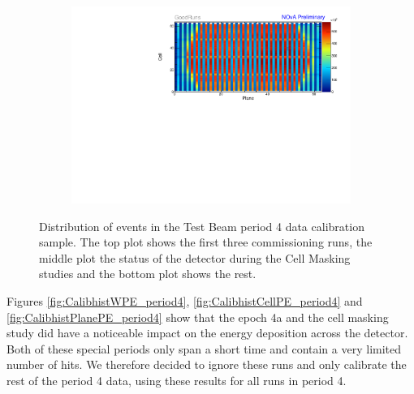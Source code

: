 \begin{figure}[!hbtp]
\begin{subfigure}[b]{\textwidth}
\includegraphics[width=\textwidth]{Plots/TBCalibration/Attenprofs_P4Data_CellPlane_GoodRuns.pdf}
\end{subfigure}
\caption[Plane-Cell distribution of hits for the period 4 data sample]{Distribution of events in the Test Beam period 4 data calibration sample. The top plot shows the first three commissioning runs, the middle plot the status of the detector during the Cell Masking studies and the bottom plot shows the rest.}
\label{fig:Calibhist_period4}
\end{figure}

Figures \ref{fig:CalibhistWPE_period4}, \ref{fig:CalibhistCellPE_period4} and \ref{fig:CalibhistPlanePE_period4} show that the epoch 4a and the cell masking study did have a noticeable impact on the energy deposition across the detector. Both of these special periods only span a short time and contain a very limited number of hits. We therefore decided to ignore these runs and only calibrate the rest of the period 4 data, using these results for all runs in period 4. 

